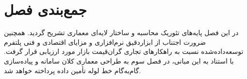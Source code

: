 \section{جمع‌بندی فصل}
در این فصل پایه‌های تئوریک محاسبه  و ساختار لایه‌ای معماری  تشریح گردید. همچنین ضرورت اجتناب از ابزاردقیق نرم‌افزاری و مزایای اقتصادی و فنی پلتفرم توسعه‌داده‌شده نسبت به راهکارهای تجاری گران‌قیمت بازار مورد ارزیابی قرار گرفت. با استناد به این مبانی، در فصل سوم به طراحی معماری کلان سامانه و پیاده‌سازی گام‌به‌گام خط لوله تأمین داده پرداخته خواهد شد.
